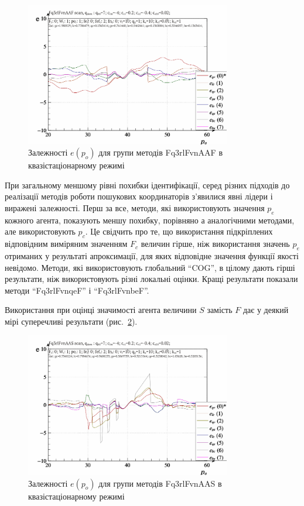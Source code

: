 \begin{figure}[htb!]
  \begin{center}
    \includegraphics[width=0.8\textwidth]{p/scan/qls-p_p_e_Fq3rlFvnAAF_scan.png}
  \end{center}
  \caption{Залежності $e(p_o)$ для групи методів Fq3rlFvnAAF в квазістаціонарному режимі}
  \label{atu:f:Fq3rlFvnAAF_scan}
\end{figure}

При загальному меншому рівні похибки ідентифікації, серед
різних підходів до реалізації методів роботи пошукових
координаторів з'явилися явні лідери і виражені залежності. Перш
за все, методи, які використовують значення
$p_e$ кожного агента, показують меншу похибку, порівняно а
аналогічними методами, але використовують
$p_c$. Це свідчить про те, що використання підкріплених
відповідним виміряним значенням
$F_c$ величин гірше, ніж використання значень
$p_e$ отриманих у результаті апроксимації, для яких відповідне значення функції якості
невідомо. Методи, які використовують глобальний ``COG'', в цілому
дають гірші результати, ніж використовують різні локальні
оцінки. Кращі результати показали методи ``Fq3rlFvnqeF'' і ``Fq3rlFvnbeF''.

Використання при оцінці значимості агента величини
$S$ замість
$F$ дає у деякий мірі суперечливі результати (рис.~\ref{atu:f:Fq3rlFvnAAS_scan}).

\begin{figure}[htb!]
  \begin{center}
    \includegraphics[width=0.8\textwidth]{p/scan/qls-p_p_e_Fq3rlFvnAAS_scan.png}
  \end{center}
  \caption{Залежності $e(p_o)$ для групи методів Fq3rlFvnAAS в квазістаціонарному режимі}
  \label{atu:f:Fq3rlFvnAAS_scan}
\end{figure}

